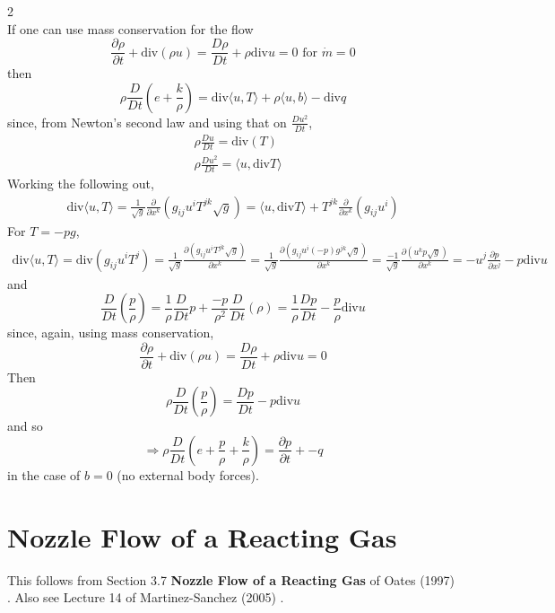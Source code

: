 \documentclass[10pt]{amsart}
\begin{document}
\begin{multicols*}{2}
\[\]
If one can use mass conservation for the flow
\[
\frac{ \partial \rho }{ \partial t} + \text{div}(\rho u) = \frac{D\rho }{ D t} + \rho \text{div}u = 0 \text{ for } \dot{m}=0
\]
then
\[
\rho \frac{D}{Dt}( e + \frac{k}{\rho } ) = \text{div}\langle u, T \rangle + \rho \langle u,b\rangle - \text{div}q
\]
since, from Newton's second law and using that on $\frac{Du^2}{Dt}$, 
\[
\begin{aligned}
  & \rho \frac{Du}{Dt} = \text{div}(T) \\
  & \rho \frac{Du^2}{Dt} = \langle u,\text{div}T \rangle
\end{aligned}
\]
Working the following out,
\[
\begin{gathered}
  \text{div}\langle u, T \rangle = \frac{1}{\sqrt{g}} \frac{ \partial }{ \partial x^k} (g_{ij} u^i T^{jk} \sqrt{g} ) = \langle u, \text{div}T \rangle + T^{jk} \frac{ \partial }{ \partial x^k}(g_{ij} u^i )
\end{gathered}
\]
For $T = -p g$, 
\[
\begin{gathered}
  \text{div}\langle u, T \rangle  = \text{div}( g_{ij}u^i T^j ) = \frac{1}{\sqrt{g}} \frac{ \partial ( g_{ij} u^i T^{jk} \sqrt{g} ) }{ \partial x^k } = \frac{1}{\sqrt{g}} \frac{ \partial ( g_{ij} u^i (-p)g^{jk } \sqrt{g} ) }{ \partial x^k} = \frac{-1}{\sqrt{g}} \frac{ \partial ( u^k p \sqrt{g} ) }{ \partial x^k} = -u^j \frac{ \partial p }{ \partial x^j} - p \text{div}u
\end{gathered}
\]
and
\[
\frac{D}{Dt}\left( \frac{ p}{\rho} \right) = \frac{1}{\rho} \frac{D}{Dt}p + \frac{-p}{\rho^2} \frac{D}{Dt}(\rho) = \frac{1}{\rho} \frac{Dp}{Dt} - \frac{p}{\rho} \text{div}u
\]
since, again, using mass conservation, 
\[
\frac{ \partial \rho }{ \partial t} + \text{div}(\rho u) = \frac{D\rho }{ Dt} + \rho \text{div}u = 0 
\]
Then
\[
\rho \frac{D}{Dt} \left( \frac{ p}{ \rho } \right) = \frac{Dp}{Dt} - p \text{div}u
\]
and so
\[
\Longrightarrow \rho \frac{D}{Dt} \left( e + \frac{p}{\rho} + \frac{k}{\rho} \right) = \frac{ \partial p}{ \partial t} + -q
\]
in the case of $b=0$ (no external body forces).

\section{Nozzle Flow of a Reacting Gas}

This follows from Section 3.7 \textbf{Nozzle Flow of a Reacting Gas} of Oates (1997) \cite{GOates1997}.  Also see Lecture 14 of Martinez-Sanchez (2005) \cite{MMartinez-Sanchez2005}.  


\end{multicols*}
\end{document}
